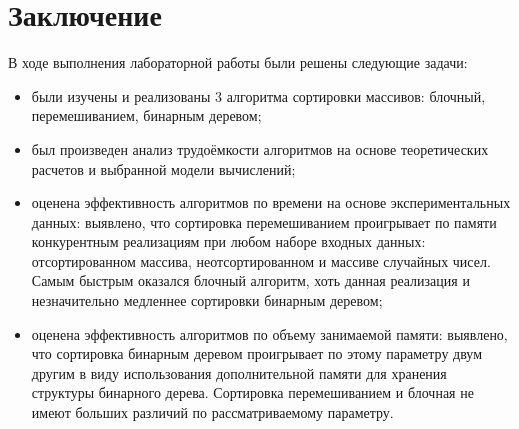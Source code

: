 \chapter*{Заключение}


В ходе выполнения лабораторной работы были решены следующие задачи:

\begin{itemize}
	\item были изучены и реализованы 3 алгоритма сортировки массивов: блочный, перемешиванием, бинарным деревом;
	\item был произведен анализ трудоёмкости алгоритмов на основе теоретических расчетов и выбранной модели вычислений;
	\item оценена эффективность алгоритмов по времени на основе экспериментальных данных: выявлено, что сортировка перемешиванием проигрывает по памяти конкурентным реализациям при любом наборе входных данных: отсортированном массива, неотсортированном и массиве случайных чисел. Самым быстрым оказался блочный алгоритм, хоть данная реализация и незначительно медленнее сортировки бинарным деревом;
	\item оценена эффективность алгоритмов по объему занимаемой памяти: выявлено, что сортировка бинарным деревом проигрывает по этому параметру двум другим в виду использования дополнительной памяти для хранения структуры бинарного дерева. Сортировка перемешиванием и блочная не имеют больших различий по рассматриваемому параметру. 
\end{itemize}
